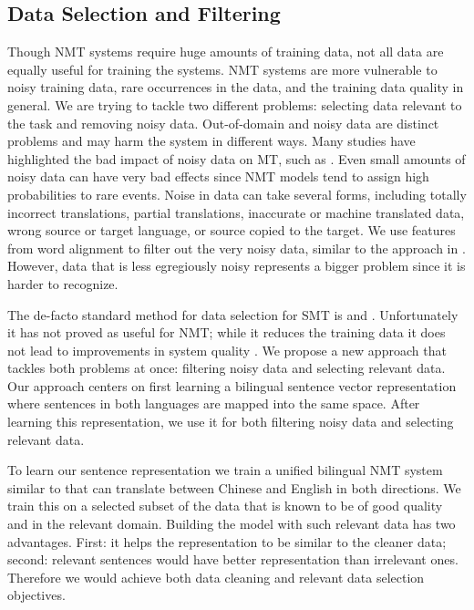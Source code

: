 \documentclass[a4paper]{article}
\begin{document}
\begin{CJK*}{UTF8}{gbsn}
\subsection{Data Selection and Filtering}
\label{sec.ds}
Though NMT systems require huge amounts of training data,  not all data are equally useful for training the systems.
NMT systems are more vulnerable to noisy training data, rare occurrences in the data, and the training data quality in general.  We are trying to tackle two different problems: selecting data relevant  to the task and removing noisy data. Out-of-domain and noisy data are distinct problems and may harm the system in different ways. Many studies have highlighted the bad impact of noisy data on MT, such as \cite{noisyNMT}. Even small amounts of noisy data can have very bad effects since NMT models tend to assign high probabilities to rare events. Noise in data can take several forms, including totally incorrect translations, partial translations, inaccurate or machine translated data, wrong source or target language, or source copied to the target. We use  features from word alignment to filter out the very noisy data, similar to the approach in \cite{datagen}. However, data that is less egregiously noisy  represents a bigger problem since it is harder to recognize.

The de-facto standard method for data selection for SMT is \cite{Moorelewis} and \cite{Axelrod}. Unfortunately it has not proved as useful for NMT; while it reduces the training data it does not lead to improvements in system quality \cite{ds_nmt}.  We propose a new approach that tackles both problems at once: filtering noisy data and selecting relevant data. Our approach centers on first learning a bilingual sentence vector representation where sentences in both languages are mapped into the same space. After learning this representation, we use it for both  filtering noisy data and selecting relevant data.

To learn our sentence representation we train a unified bilingual NMT system similar to \cite{zoph2016transfer} that can translate between Chinese and English in both directions. We train this on a selected subset of the data  that is known to be of good quality and in the relevant domain. Building the model with such relevant data has two advantages. First: it helps the representation to be similar to the cleaner data; second: relevant sentences would have better representation than irrelevant ones. Therefore we would achieve both data cleaning and relevant data selection objectives.



\end{CJK*}
\end{document}

